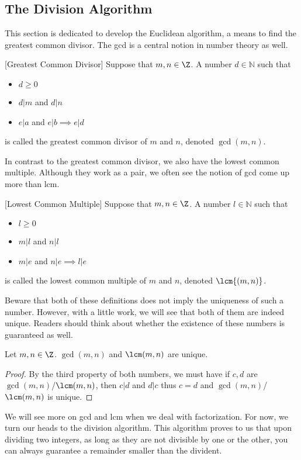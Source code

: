 \subsection{The Division Algorithm}
This section is dedicated to develop the Euclidean algorithm, a means to find the greatest common divisor. The gcd is a central notion in number theory as well. 
\begin{defn}{}{}[Greatest Common Divisor] Suppose that $m,n\in\Z$. A number $d\in\mathbb{N}$ such that 
\begin{itemize}
\item $d\geq 0$
\item $d|m$ and $d|n$
\item $e|a$ and $e|b\implies e|d$
\end{itemize}
is called the greatest common divisor of $m$ and $n$, denoted $\gcd{(m,n)}$.
\end{defn}

In contrast to the greatest common divisor, we also have the lowest common multiple. Although they work as a pair, we often see the notion of gcd come up more than lcm. 

\begin{defn}{}{}[Lowest Common Multiple] Suppose that $m,n\in\Z$. A number $l\in\mathbb{N}$ such that 
\begin{itemize}
\item $l\geq 0$
\item $m|l$ and $n|l$
\item $m|e$ and $n|e\implies l|e$
\end{itemize}
is called the lowest common multiple of $m$ and $n$, denoted $\lcm{(m,n)}$.
\end{defn}

Beware that both of these definitions does not imply the uniqueness of such a number. However, with a little work, we will see that both of them are indeed unique. Readers should think about whether the existence of these numbers is guaranteed as well. 

\begin{prp}{}{} Let $m,n\in\Z$. $\gcd(m,n)$ and $\lcm(m,n)$ are unique. 
\end{prp}
\begin{proof}
By the third property of both numbers, we must have if $c,d$ are $\gcd(m,n)$/$\lcm(m,n)$, then $c|d$ and $d|c$ thus $c=d$ and $\gcd(m,n)$/$\lcm(m,n)$ is unique. 
\end{proof}

We will see more on gcd and lcm when we deal with factorization. For now, we turn our heads to the division algorithm. This algorithm proves to us that upon dividing two integers, as long as they are not divisible by one or the other, you can always guarantee a remainder smaller than the divident. 

